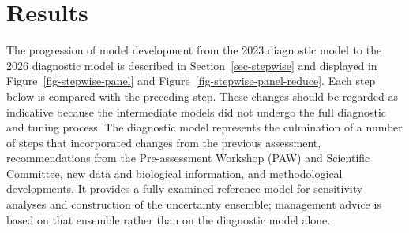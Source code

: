 \documentclass[
  english,
  a4paper,
  a4paper,
  11pt]{SCreport}
\begin{document}
\section{Results}\label{results}

The progression of model development from the 2023 diagnostic model to
the 2026 diagnostic model is described in Section~\ref{sec-stepwise} and
displayed in Figure~\ref{fig-stepwise-panel} and
Figure~\ref{fig-stepwise-panel-reduce}. Each step below is compared with
the preceding step. These changes should be regarded as indicative
because the intermediate models did not undergo the full diagnostic and
tuning process. The diagnostic model represents the culmination of a
number of steps that incorporated changes from the previous assessment,
recommendations from the Pre-assessment Workshop (PAW) and Scientific
Committee, new data and biological information, and methodological
developments. It provides a fully examined reference model for
sensitivity analyses and construction of the uncertainty ensemble;
management advice is based on that ensemble rather than on the
diagnostic model alone.
\end{document}
